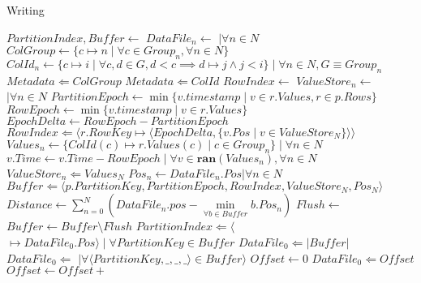 \documentclass[fleqn]{article}
\let\algIf\If
\let\If\algIf
\begin{document}
\begin{algorithm}
\scriptsize
\caption{Writing}
\begin{algorithmic}[1]
\State $PartitionIndex, Buffer \gets $ 
\State $DataFile_{n} \gets $  $\mid \forall n \in N$
\Statex
\State $ColGroup \gets \{c \mapsto n \mid \forall c \in Group_{n}, \forall n \in N \}$
\State $ColId_{n} \gets \{c \mapsto i \mid \forall c, d \in G, d < c \implies d \mapsto j \wedge j < i \} \mid \forall n \in N, G \equiv Group_{n}$
\State $Metadata \Leftarrow ColGroup$
\State $Metadata \Leftarrow ColId$
\Statex
{} 
 \State $RowIndex \gets $ 
 \State $ValueStore_{n} \gets $  $ \mid \forall n \in N$
 \State $PartitionEpoch \gets \min \{v.timestamp \mid v \in r.Values, r \in p.Rows\}$
 \Statex
   \State $RowEpoch \gets \min \{v.timestamp \mid v \in r.Values\}$
   \State $EpochDelta \gets RowEpoch - PartitionEpoch$
   \State $RowIndex \Leftarrow \langle r.RowKey \mapsto \langle EpochDelta, \{ v.Pos \mid v \in ValueStore_{N} \}\rangle \rangle $ 
   \State $Values_{n} \gets \{ ColId(c) \mapsto r.Values(c) \mid c \in Group_{n} \} \mid \forall n \in N$
   \State $v.Time \gets v.Time - RowEpoch \mid \forall v \in \mathbf{ran}(Values_{n}), \forall n \in N$
   \State $ ValueStore_{n} \Leftarrow Values_{N} $
 \EndFor
\Statex
 \State $Pos_{n} \gets DataFile_{n}.Pos | \forall n \in N$
 \State $Buffer \Leftarrow \langle p.PartitionKey, PartitionEpoch, RowIndex, ValueStore_{N}, Pos_{N} \rangle$
 \State $Distance \gets \sum\limits_{n=0}^{N} (DataFile_{n}.pos - \min\limits_{\forall b \in Buffer} b.Pos_{n}) $
   \State $Flush \gets$ 
   \State {}
   \State $Buffer \gets Buffer \setminus Flush$
 \EndIf
\EndFor
\State {}
\EndProcedure
\Statex
{}
   \State $PartitionIndex \Leftarrow \langle $$ \mapsto DataFile_{0}.Pos \rangle \mid \forall PartitionKey \in Buffer$
   \State $DataFile_{0} \Leftarrow \lvert Buffer \rvert$
   \State $DataFile_{0} \Leftarrow $  $ \mid \forall \langle PartitionKey, \_,\_,\_\rangle \in Buffer \rangle$
   \State $Offset \gets 0$
     \State $DataFile_0 \Leftarrow Offset$
     \State $Offset \gets Offset + $ 

\end{algorithmic}
\end{algorithm}
\end{document}
